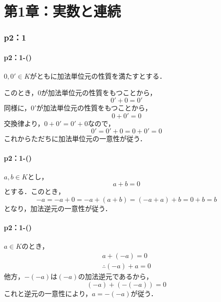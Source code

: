 
\part*{第1章：実数と連続}

\section*{p2：1}


\subsection*{p2：1-()}
\begin{tproof}
    $0,0' \in K$がともに加法単位元の性質を満たすとする．

    このとき，$0$が加法単位元の性質をもつことから，
    \[
        0'+0=0'
    \]
    同様に，$0'$が加法単位元の性質をもつことから，
    \[
        0+0' = 0
    \]
    交換律より，$0+0'=0'+0$なので，
    \[
        0'=0'+0 =0+0' =0
    \]
    これからただちに加法単位元の一意性が従う．
\end{tproof}

\subsection*{p2：1-()}
\begin{tproof}
    $a ,b \in K$とし，
    \[
        a+b =0
    \]
    とする．このとき，
    \[
        -a = -a+0 = -a +(a+b)=(-a+a)+b =0+b = b
    \]
    となり，加法逆元の一意性が従う．
\end{tproof}

\subsection*{p2：1-()}
\begin{tproof}
    $a \in K$のとき，
    \begin{gather*}
        a+(-a)=0 \\
        \therefore (-a)+a =0
    \end{gather*}
    他方，$-(-a)$は$(-a)$の加法逆元であるから，
    \[
        (-a)+(-(-a))=0
    \]
    これと逆元の一意性により，$a=-(-a)$が従う．
\end{tproof}

